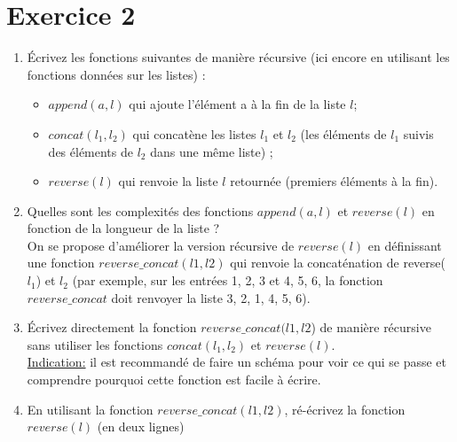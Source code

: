 \documentclass[10pt,a4paper]{article}
\begin{document}
\section*{Exercice 2}
\begin{enumerate}
    \item Écrivez les fonctions suivantes de manière récursive (ici encore en utilisant les fonctions données sur les listes) :
    \begin{itemize}
        \item $append(a,l)$ qui ajoute l’élément a à la fin de la liste $l$;
        \item $concat(l_1,l_2)$ qui concatène les listes $l_1$ et $l_2$ (les éléments de $l_1$ suivis des éléments de $l_2$
dans une même liste) ;
        \item $reverse(l)$ qui renvoie la liste $l$ retournée (premiers éléments à la fin).
    \end{itemize}
    \item Quelles sont les complexités des fonctions $append(a,l)$ et $reverse(l)$ en fonction de la longueur de la liste ?\\
 On se propose d’améliorer la version récursive de $reverse(l)$ en définissant une fonction $reverse\_concat(l1,l2)$ qui renvoie la concaténation de reverse($l_1$) et $l_2$ (par exemple, sur les entrées 1, 2, 3 et 4, 5, 6, la fonction $reverse\_concat$ doit renvoyer la liste 3, 2, 1, 4, 5, 6).
     \item Écrivez directement la fonction $reverse\_concat(l1,l2$) de manière récursive sans utiliser les fonctions $concat(l_1,l_2)$ et $reverse(l)$.\\
\underline{Indication:} il est recommandé de faire un schéma pour voir ce qui se passe et comprendre pourquoi
cette fonction est facile à écrire.\\
    \item En utilisant la fonction $reverse\_concat(l1, l2)$, ré-écrivez la fonction $reverse(l)$ (en deux lignes)
\end{enumerate}
\end{document}
